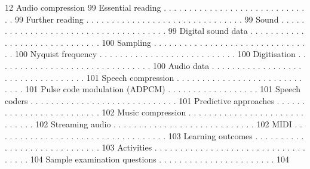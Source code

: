 12 Audio compression 99
Essential reading . . . . . . . . . . . . . . . . . . . . . . . . . . . . . . 99
Further reading . . . . . . . . . . . . . . . . . . . . . . . . . . . . . . . 99
Sound . . . . . . . . . . . . . . . . . . . . . . . . . . . . . . . . . . . . . 99
Digital sound data . . . . . . . . . . . . . . . . . . . . . . . . . . . . . . 100
Sampling . . . . . . . . . . . . . . . . . . . . . . . . . . . . . . . . 100
Nyquist frequency . . . . . . . . . . . . . . . . . . . . . . . . . . . 100
Digitisation . . . . . . . . . . . . . . . . . . . . . . . . . . . . . . . 100
Audio data . . . . . . . . . . . . . . . . . . . . . . . . . . . . . . . . . . 101
Speech compression . . . . . . . . . . . . . . . . . . . . . . . . . . . . . 101
Pulse code modulation (ADPCM) . . . . . . . . . . . . . . . . . . 101
Speech coders . . . . . . . . . . . . . . . . . . . . . . . . . . . . . 101
Predictive approaches . . . . . . . . . . . . . . . . . . . . . . . . . 102
Music compression . . . . . . . . . . . . . . . . . . . . . . . . . . . . . 102
Streaming audio . . . . . . . . . . . . . . . . . . . . . . . . . . . . 102
MIDI . . . . . . . . . . . . . . . . . . . . . . . . . . . . . . . . . . 103
Learning outcomes . . . . . . . . . . . . . . . . . . . . . . . . . . . . . 103
Activities . . . . . . . . . . . . . . . . . . . . . . . . . . . . . . . . . . . 104
Sample examination questions . . . . . . . . . . . . . . . . . . . . . . . 104
